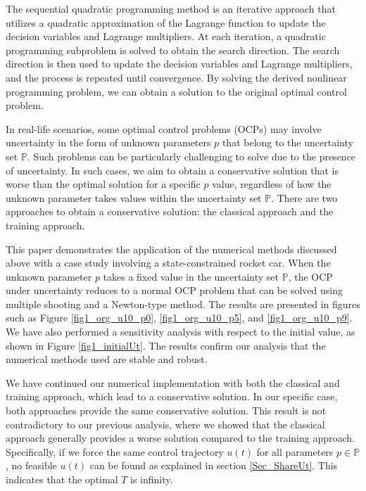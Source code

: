 \documentclass  [
  paper    = a4,
  BCOR     = 10mm,
  twoside,
  fontsize = 12pt,
  fleqn,
  toc      = bibnumbered,
  toc      = listofnumbered,
  numbers  = noendperiod,
  headings = normal,
  listof   = leveldown,
  version  = 3.03
]                                       {scrreprt}
\newcommand{\<}{\langle}
\renewcommand{\>}{\rangle}
\begin{document}
The sequential quadratic programming method is an iterative approach that utilizes a quadratic approximation of the Lagrange function to update the decision variables and Lagrange multipliers. At each iteration, a quadratic programming subproblem is solved to obtain the search direction. The search direction is then used to update the decision variables and Lagrange multipliers, and the process is repeated until convergence. By solving the derived nonlinear programming problem, we can obtain a solution to the original optimal control problem.


In real-life scenarios, some optimal control problems (OCPs) may involve uncertainty in the form of unknown parameters $p$ that belong to the uncertainty set $\mathbb{P}$. Such problems can be particularly challenging to solve due to the presence of uncertainty. In such cases, we aim to obtain a conservative solution that is worse than the optimal solution for a specific $p$ value, regardless of how the unknown parameter takes values within the uncertainty set $\mathbb{P}$. There are two approaches to obtain a conservative solution: the classical approach and the training approach.

This paper demonstrates the application of the numerical methods discussed above with a case study involving a state-constrained rocket car. When the unknown parameter $p$ takes a fixed value in the uncertainty set $\mathbb{P}$, the OCP under uncertainty reduces to a normal OCP problem that can be solved using multiple shooting and a Newton-type method. The results are presented in figures such as Figure \ref{fig1_org_u10_p0}, \ref{fig1_org_u10_p5}, and \ref{fig1_org_u10_p9}. We have also performed a sensitivity analysis with respect to the initial value, as shown in Figure \ref{fig1_initialUt}. The results confirm our analysis that the numerical methods used are stable and robust.

We have continued our numerical implementation with both the classical and training approach, which lead to a conservative solution. In our specific case, both approaches provide the same conservative solution. This result is not contradictory to our previous analysis, where we showed that the classical approach generally provides a worse solution compared to the training approach. Specifically, if we force the same control trajectory $u(t)$ for all parameters $p \in \mathbb{P}$, no feasible $u(t)$ can be found as explained in section \ref{Sec_ShareUt}. This indicates that the optimal $T$ is infinity.
\end{document}
